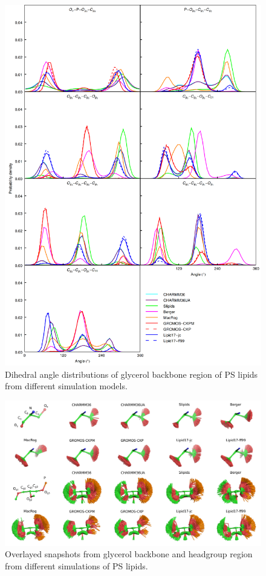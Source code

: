 \documentclass[journal=jpcbfk]{achemso}
\begin{document}
\begin{figure}[]
  \centering
  \includegraphics[width=15.0cm]{../Figs/figS6.png}
  \caption{\label{dihedralsGLY}
    Dihedral angle distributions of glycerol backbone region of PS lipids from different simulation models.
  }
\end{figure}

\begin{figure}[]
  \centering
  \includegraphics[width=18.0cm]{../Figs/figS8.png}
  \caption{\label{HGandGLYstructuresPS}
    Overlayed snapshots from glycerol backbone and headgroup region from 
    different simulations of PS lipids.
  }
\end{figure}
\end{document}
